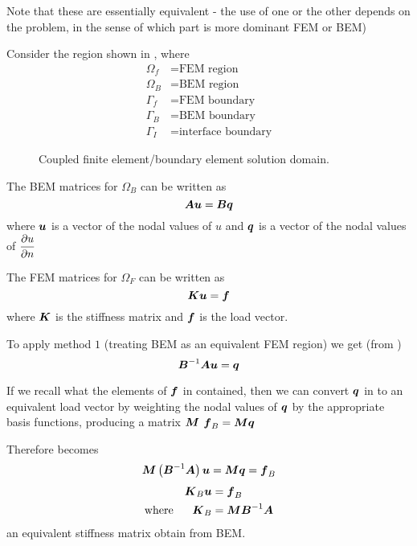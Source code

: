 Note that these are essentially equivalent - the use of one or the other
depends on the problem, in the sense of which part is more dominant FEM or
BEM)

Consider the region shown in , where
\begin{align*}
  \Omega_{f} &= \text{FEM region}\\ \Omega_{B} &= \text{BEM region}\\ 
  \Gamma_{f} &= \text{FEM boundary}\\ \Gamma_{B} &= \text{BEM
    boundary}\\ \Gamma_{I} &= \text{interface boundary}
\end{align*}
\begin{figure} \centering
  
  \caption{Coupled finite element/boundary element solution domain.}
  \label{fig:region}
\end{figure}
The BEM matrices for $\Omega_{B}$ can be written as
\begin{equation}
  \matr{A}\vectr{u} = \matr{B}\vectr{q}
  \label{eqn:BEM matrices}
\end{equation}
where $\boldsymbol{u}$ is a vector of the nodal values of $u$ and $\boldsymbol{q}$ is a vector
of the nodal values of $ \dfrac{\partial u}{\partial n} $

The FEM matrices for $\Omega_{F}$ can be written as
\begin{equation}
  \matr{K}\vectr{u} = \vectr{f}
  \label{eqn:FEM matrices}
\end{equation}
where $\matr{K}$ is the stiffness matrix and $\boldsymbol{f}$ is the load vector.  

To apply method $1$ (\ie treating BEM as an equivalent FEM region) we get (from
)
\begin{equation}
  \matr{B}^{-1}\matr{A}\vectr{u}=\vectr{q}
  \label{eqn:appliedmethod}
\end{equation}

If we recall what the elements of $\boldsymbol{f}$ in 
contained, then we can convert $\boldsymbol{q}$ in  to an
equivalent load vector by weighting the nodal values of $\boldsymbol{q}$ by the
appropriate basis functions, producing a matrix $\matr{M}$ \ie 
$\vectr{f}_{B}=\matr{M}\vectr{q}$

Therefore  becomes 
\begin{equation*}
  \matr{M}\pbrac{\matr{B}^{-1}\matr{A}}\vectr{u}=  \matr{M}\vectr{q} = \vectr{f}_{B}
\end{equation*}
\ie 
\begin{alignat*}{2}
    && \matr{K}_{B}\vectr{u} &= \vectr{f}_{B} \\
    \text{where} && \matr{K}_{B} &= \matr{M}\matr{B}^{-1}\matr{A}
\end{alignat*}
an equivalent stiffness matrix obtain from BEM.

